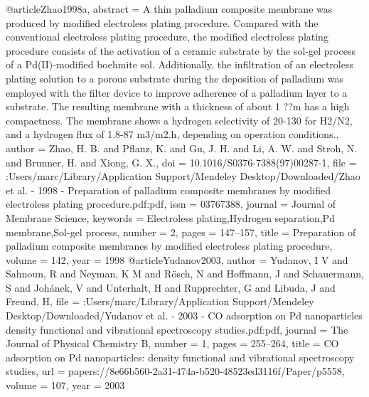 @article{Zhao1998a,
abstract = {A thin palladium composite membrane was produced by modified electroless plating procedure. Compared with the conventional electroless plating procedure, the modified electroless plating procedure consists of the activation of a ceramic substrate by the sol-gel process of a Pd(II)-modified boehmite sol. Additionally, the infiltration of an electroless plating solution to a porous substrate during the deposition of palladium was employed with the filter device to improve adherence of a palladium layer to a substrate. The resulting membrane with a thickness of about 1 ??m has a high compactness. The membrane shows a hydrogen selectivity of 20-130 for H2/N2, and a hydrogen flux of 1.8-87 m3/m2.h, depending on operation conditions.},
author = {Zhao, H. B. and Pflanz, K. and Gu, J. H. and Li, A. W. and Stroh, N. and Brunner, H. and Xiong, G. X.},
doi = {10.1016/S0376-7388(97)00287-1},
file = {:Users/marc/Library/Application Support/Mendeley Desktop/Downloaded/Zhao et al. - 1998 - Preparation of palladium composite membranes by modified electroless plating procedure.pdf:pdf},
issn = {03767388},
journal = {Journal of Membrane Science},
keywords = {Electroless plating,Hydrogen separation,Pd membrane,Sol-gel process},
number = {2},
pages = {147--157},
title = {{Preparation of palladium composite membranes by modified electroless plating procedure}},
volume = {142},
year = {1998}
}
@article{Yudanov2003,
author = {Yudanov, I V and Sahnoun, R and Neyman, K M and R{\"{o}}sch, N and Hoffmann, J and Schauermann, S and Joh{\'{a}}nek, V and Unterhalt, H and Rupprechter, G and Libuda, J and Freund, H},
file = {:Users/marc/Library/Application Support/Mendeley Desktop/Downloaded/Yudanov et al. - 2003 - CO adsorption on Pd nanoparticles density functional and vibrational spectroscopy studies.pdf:pdf},
journal = {The Journal of Physical Chemistry B},
number = {1},
pages = {255--264},
title = {{CO adsorption on Pd nanoparticles: density functional and vibrational spectroscopy studies}},
url = {papers://8e66b560-2a31-474a-b520-48523ed3116f/Paper/p5558},
volume = {107},
year = {2003}
}
